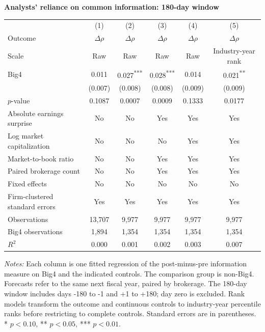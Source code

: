 \documentclass[10pt]{article}
\newcommand{\sym}[1]{\textsuperscript{#1}}
\begin{document}
\begin{minipage}{21.0cm}
\fontsize{10}{12}\selectfont
\setlength{\tabcolsep}{4pt}\renewcommand{\arraystretch}{1.12}
{\large\bfseries Analysts' reliance on common information: 180-day window}\par\medskip
\begin{tabular*}{\linewidth}{@{\extracolsep{\fill}}lccccc@{}}
\toprule
 & (1) & (2) & (3) & (4) & (5) \\
Outcome & $\Delta\rho$ & $\Delta\rho$ & $\Delta\rho$ & $\Delta\rho$ & $\Delta\rho$ \\
Scale & Raw & Raw & Raw & Raw & Industry-year rank \\
\midrule
Big4 & 0.011 & 0.027\sym{***} & 0.028\sym{***} & 0.014 & 0.021\sym{**} \\
 & (0.007) & (0.008) & (0.008) & (0.009) & (0.009) \\
$p$-value & 0.1087 & 0.0007 & 0.0009 & 0.1333 & 0.0177 \\
\midrule
Absolute earnings surprise & No & No & Yes & Yes & Yes \\
Log market capitalization & No & No & No & Yes & Yes \\
Market-to-book ratio & No & No & Yes & Yes & Yes \\
Paired brokerage count & No & No & Yes & Yes & Yes \\
Fixed effects & No & No & No & No & No \\
Firm-clustered standard errors & Yes & Yes & Yes & Yes & Yes \\
Observations & 13,707 & 9,977 & 9,977 & 9,977 & 9,977 \\
Big4 observations & 1,894 & 1,354 & 1,354 & 1,354 & 1,354 \\
$R^2$ & 0.000 & 0.001 & 0.002 & 0.003 & 0.007 \\
\bottomrule\end{tabular*}\par\medskip
\fontsize{9}{11}\selectfont\textit{Notes:} Each column is one fitted regression of the post-minus-pre information measure on Big4 and the indicated controls. The comparison group is non-Big4. Forecasts refer to the same next fiscal year, paired by brokerage. The 180-day window includes days -180 to -1 and +1 to +180; day zero is excluded. Rank models transform the outcome and continuous controls to industry-year percentile ranks before restricting to complete controls. Standard errors are in parentheses. * $p<0.10$, ** $p<0.05$, *** $p<0.01$.
\end{minipage}
\end{document}

